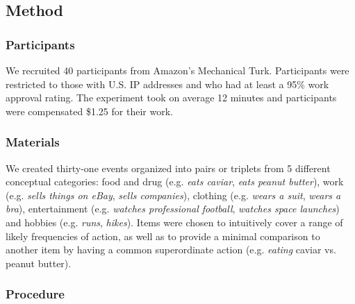 \documentclass[10pt,letterpaper]{article}
\begin{document}
\subsection{Method}

\subsubsection{Participants}
We recruited 40 participants from Amazon's Mechanical Turk.
Participants were restricted to those with U.S. IP addresses and who had at least a 95\% work approval rating.
The experiment took on average 12 minutes and participants were compensated \$1.25 for their work.

\subsubsection{Materials}

We created thirty-one events organized into pairs or triplets from 5 different conceptual categories: food and drug (e.g. \emph{eats caviar}, \emph{eats peanut butter}), work (e.g. \emph{sells things on eBay}, \emph{sells companies}), clothing (e.g. \emph{wears a suit}, \emph{wears a bra}), entertainment (e.g. \emph{watches professional football}, \emph{watches space launches}) and hobbies (e.g. \emph{runs}, \emph{hikes}). 
Items were chosen to intuitively cover a range of likely frequencies of action, as well as to provide a minimal comparison to another item by having a common superordinate action (e.g. \emph{eating} caviar vs. peanut butter).

\subsubsection{Procedure}
\end{document}
